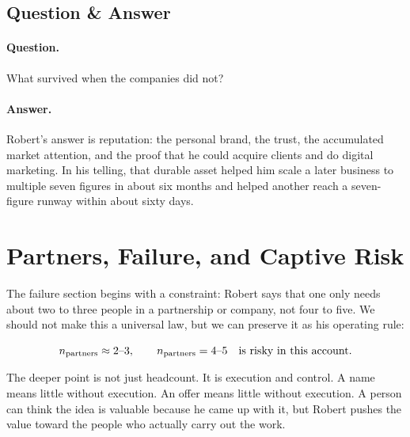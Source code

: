 \subsection{Question \& Answer}

\paragraph{Question.} What survived when the companies did not?

\paragraph{Answer.} Robert's answer is reputation: the personal brand, the trust, the accumulated market attention, and the proof that he could acquire clients and do digital marketing. In his telling, that durable asset helped him scale a later business to multiple seven figures in about six months and helped another reach a seven-figure runway within about sixty days.

\section{Partners, Failure, and Captive Risk}

The failure section begins with a constraint: Robert says that one only needs about two to three people in a partnership or company, not four to five. We should not make this a universal law, but we can preserve it as his operating rule:

\begin{equation}
n_{\mathrm{partners}} \approx 2\hbox{--}3,
\qquad
n_{\mathrm{partners}} = 4\hbox{--}5 \quad \hbox{is risky in this account.}
\end{equation}

The deeper point is not just headcount. It is execution and control. A name means little without execution. An offer means little without execution. A person can think the idea is valuable because he came up with it, but Robert pushes the value toward the people who actually carry out the work.

\begin{figure}
\centering
{}
\end{figure}


